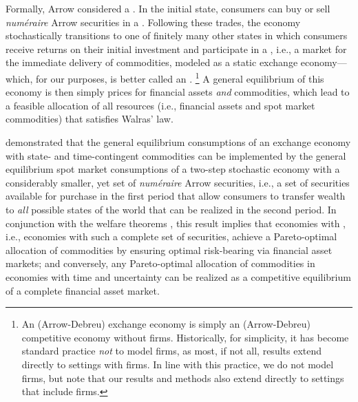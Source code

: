 Formally, Arrow considered a .
In the initial state, consumers can buy or sell \textit{num\'eraire} Arrow securities in a .
Following these trades, the economy stochastically transitions to one of finitely many other states in which consumers receive returns on their initial investment and participate in a , i.e., a market for the immediate delivery of commodities, modeled as a static exchange economy---which, for our purposes, is better called an .%
\footnote{An (Arrow-Debreu) exchange economy is simply an (Arrow-Debreu) competitive economy without firms. Historically, for simplicity, 
it has become standard practice \emph{not\/} to model firms, as most, if not all, results extend directly to settings with firms. 
In line with this practice, we do not model firms, but note that our results and methods also extend directly to settings that include firms.}
A general equilibrium of this economy is then simply prices for financial assets \emph{and\/} %
commodities, which lead to a feasible allocation of all resources (i.e., financial assets and spot market commodities) that satisfies Walras' law. 

\citet{arrow1964role} demonstrated that the general equilibrium consumptions of an exchange economy with state- and time-contingent commodities can be implemented by the general equilibrium spot market consumptions of a two-step stochastic economy with a considerably smaller, yet  set of \textit{num\'eraire} Arrow securities, i.e., a set of securities available for purchase in the first period that allow consumers to transfer wealth to \emph{all\/} possible states of the world that can be realized in the second period.
In conjunction with the welfare theorems \cite{debreu1951pareto, arrow1951extension}, this result implies that economies with , i.e., economies with such a complete set of securities, 
achieve a Pareto-optimal allocation of commodities by ensuring optimal risk-bearing via financial asset markets; and
conversely, any Pareto-optimal allocation of commodities in economies with time and uncertainty can be realized as a competitive equilibrium of a complete financial asset market.


